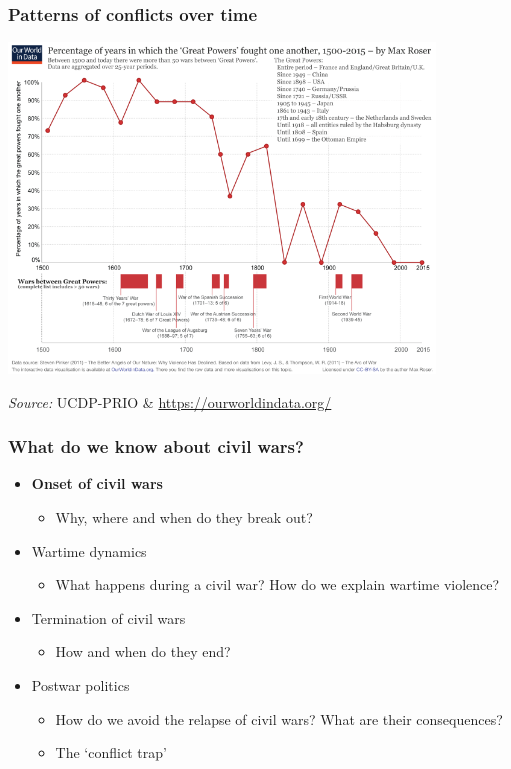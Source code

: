 \documentclass[utf8, xcolor=dvipsnames]{beamer}
\begin{document}
\begin{frame}
\frametitle{Patterns of conflicts over time}
\centering

\includegraphics[width = 0.85\textwidth]{img/great_powers_wars}

{\small \textit{Source:} UCDP-PRIO \& \url{https://ourworldindata.org/}}

\end{frame}

\begin{frame}
\frametitle{What do we know about civil wars?}
\centering

\begin{itemize}
  \item<1-> \textbf{Onset of civil wars}
  \begin{itemize}
    \item Why, where and when do they break out?
  \end{itemize}
  \item<2-> Wartime dynamics
  \begin{itemize}
    \item What happens during a civil war? How do we explain wartime violence?
  \end{itemize}
  \item<3-> Termination of civil wars
  \begin{itemize}
    \item How and when do they end?
  \end{itemize}
  \item<4-> Postwar politics
  \begin{itemize}
    \item How do we avoid the relapse of civil wars? What are their consequences?
    \item The `conflict trap'
  \end{itemize}
\end{itemize}

\end{frame}
\end{document}
